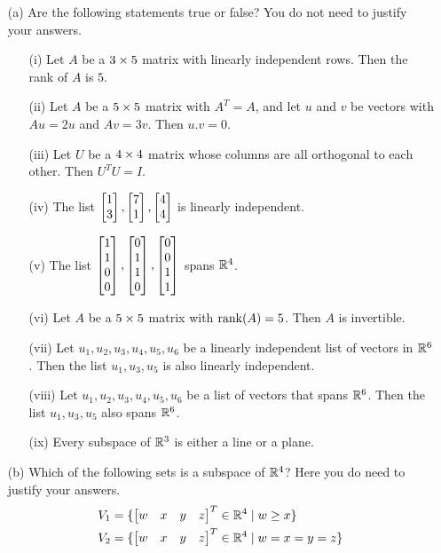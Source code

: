 \documentclass[a4paper]{article}
\begin{document}
\begin{problem}[Mock 2]
 \begin{itemize}
  \item[(a)]
   Are the following statements true or false?  You do not need to justify your answers.
   \begin{itemize}
    \item[(i)] Let $A$ be a $3\times 5$ matrix with linearly independent
     rows.  Then the rank of $A$ is $5$.
    \item[(ii)] Let $A$ be a $5\times 5$ matrix with $A^T=A$, and let $u$
     and $v$ be vectors with $Au=2u$ and $Av=3v$.  Then $u.v=0$.
    \item[(iii)] Let $U$ be a $4\times 4$ matrix whose columns are all
     orthogonal to each other.  Then $U^TU=I$.
    \item[(iv)] The list $\left[\begin{matrix} 1\\3\end{matrix}\right],\left[\begin{matrix} 7\\1\end{matrix}\right],\left[\begin{matrix} 4\\4\end{matrix}\right]$
     is linearly independent.
    \item[(v)] The list
     $\left[\begin{matrix} 1\\1\\0\\0\end{matrix}\right],\left[\begin{matrix} 0\\1\\1\\0\end{matrix}\right],\left[\begin{matrix} 0\\0\\1\\1\end{matrix}\right]$
     spans ${\mathbb{R}}^4$.
    \item[(vi)] Let $A$ be a $5\times 5$ matrix with $\operatorname{rank}(A)=5$.  Then
     $A$ is invertible.
    \item[(vii)] Let $u_1,u_2,u_3,u_4,u_5,u_6$ be a linearly
     independent list of vectors in ${\mathbb{R}}^6$.  Then the list
     $u_1,u_3,u_5$ is also linearly independent.
    \item[(viii)] Let $u_1,u_2,u_3,u_4,u_5,u_6$ be a list of vectors
     that spans ${\mathbb{R}}^6$.  Then the list $u_1,u_3,u_5$ also spans
     ${\mathbb{R}}^6$.
    \item[(ix)] Every subspace of ${\mathbb{R}}^3$ is either a line or a plane.
   \end{itemize}
  \item[(b)]
   Which of the following sets is a subspace of ${\mathbb{R}}^4$?  Here you do
   need to justify your answers. 
   \begin{align*}
    V_1 &= \{\bbm w&x&y&z\ebm^T \in\R^4 \st w\geq x\} \\
    V_2 &= \{\bbm w&x&y&z\ebm^T \in\R^4 \st w=x=y=z\} \\

\end{align*}
\end{itemize}
\end{problem}
\end{document}
